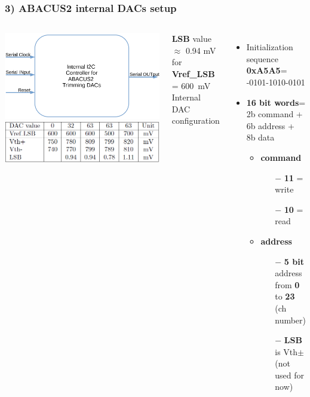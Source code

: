 \documentclass[aspectratio=169]{beamer}
\begin{document}
	\begin{frame}
		\frametitle{3) ABACUS2 internal DACs setup}	
		\begin{columns}
			\begin{center}
				\includegraphics[width=0.7 \textwidth]{IMG2/INTERNALDAC}
				\includegraphics[width=0.7 \textwidth]{IMG/TableLSB.PNG}
			\end{center}
			{\small \textbf{LSB} value $\approx$ 0.94 mV for \textbf{Vref\_LSB} = 600~mV}
			{\color{blue} Internal DAC configuration}
			\begin{itemize}
				\item Initialization sequence \textbf{0xA5A5}= 
				-0101-1010-0101
				\item \textbf{16 bit words}= \newline 2b command + 6b address + 8b data
				\begin{itemize}
					\item \textbf{command}
					\begin{itemize}
						\item[$-$] \textbf{11} = write
						\item[$-$] \textbf{10} = read
					\end{itemize}
					\item \textbf{address}
					\begin{itemize}
						\item[$-$] \textbf{5 bit} address from \textbf{0} to \textbf{23} (ch number)
						\item[$-$] \textbf{LSB} is Vth$\pm$ (not used for now)

\end{itemize}
\end{itemize}
\end{itemize}
\end{columns}
\end{frame}
\end{document}
